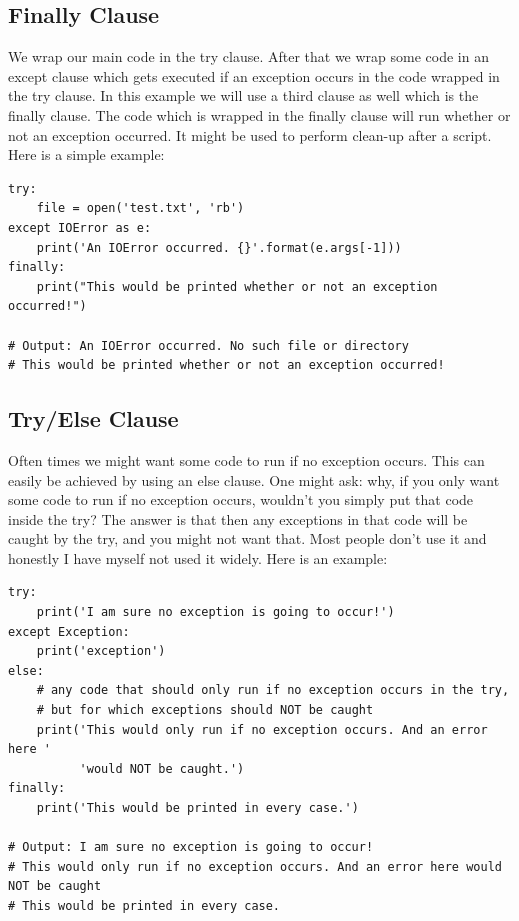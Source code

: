 \documentclass{report}
\begin{document}
    \subsection{Finally Clause}
    \bigbreak \noindent 
    We wrap our main code in the try clause. After that we wrap some code in an except clause which gets executed if an exception occurs in the code wrapped in the try clause. In this example we will use a third clause as well which is the finally clause. The code which is wrapped in the finally clause will run whether or not an exception occurred. It might be used to perform clean-up after a script. Here is a simple example:
    \begin{verbatim}
try:
    file = open('test.txt', 'rb')
except IOError as e:
    print('An IOError occurred. {}'.format(e.args[-1]))
finally:
    print("This would be printed whether or not an exception occurred!")

# Output: An IOError occurred. No such file or directory
# This would be printed whether or not an exception occurred!
    \end{verbatim}

    \bigbreak \noindent \bigbreak \noindent 
    \subsection{Try/Else Clause}
    \bigbreak \noindent
    Often times we might want some code to run if no exception occurs. This can easily be achieved by using an else clause. One might ask: why, if you only want some code to run if no exception occurs, wouldn’t you simply put that code inside the try? The answer is that then any exceptions in that code will be caught by the try, and you might not want that. Most people don’t use it and honestly I have myself not used it widely. Here is an example:
    \begin{verbatim}
try:
    print('I am sure no exception is going to occur!')
except Exception:
    print('exception')
else:
    # any code that should only run if no exception occurs in the try,
    # but for which exceptions should NOT be caught
    print('This would only run if no exception occurs. And an error here '
          'would NOT be caught.')
finally:
    print('This would be printed in every case.')

# Output: I am sure no exception is going to occur!
# This would only run if no exception occurs. And an error here would NOT be caught
# This would be printed in every case.
    \end{verbatim}
\end{document}
